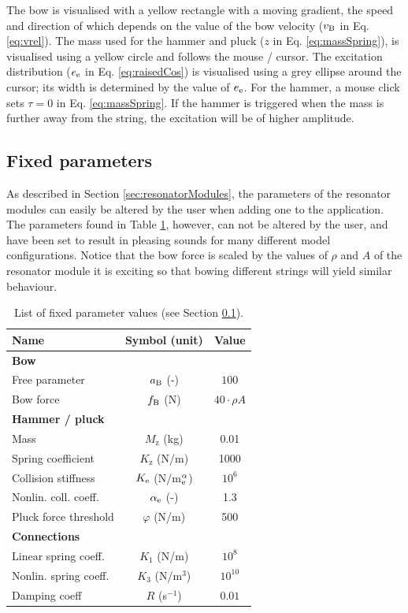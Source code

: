 \documentclass{article}
\begin{document}
The bow is visualised with a yellow rectangle with a moving gradient, the speed and direction of which depends on the value of the bow velocity ($v_{\text{B}}$ in Eq. \eqref{eq:vrel}). The mass used for the hammer and pluck ($z$ in Eq. \eqref{eq:massSpring}), is visualised using a yellow circle and follows the mouse / cursor. The excitation distribution ($e_{\text{e}}$ in Eq. \eqref{eq:raisedCos}) is visualised using a grey ellipse around the cursor; its width is determined by the value of $e_{\text{e}}$. For the hammer, a mouse click sets $\tau=0$ in Eq. \eqref{eq:massSpring}. If the hammer is triggered when the mass is further away from the string, the excitation will be of higher amplitude.

\subsection{Fixed parameters}\label{sec:fixedParams}
As described in Section \ref{sec:resonatorModules}, the parameters of the resonator modules can easily be altered by the user when adding one to the application. The parameters found in Table \ref{tab:parameters}, however, can not be altered by the user, and have been set to result in pleasing sounds for many different model configurations. Notice that the bow force is scaled by the values of $\rho$ and $A$ of the resonator module it is exciting so that bowing different strings will yield similar behaviour.
\begin{table}[t]\label{tab:parameters}
\begin{center}
\begin{tabular}{|l|c|c|}
    \hline
    Name & Symbol (unit) & Value\\ \hline
    \multicolumn{3}{|l|}{\bf Bow}\\ \hline
    Free parameter & $a_{\text{B}}$ (-) & $100$\\
    Bow force & $f_{\text{B}}$ (N) & $40 \cdot \rho A$\\\hline
    \multicolumn{3}{|l|}{\bf Hammer / pluck}\\ \hline
    Mass & $M_\text{z}$ (kg) & 0.01\\
    Spring coefficient & $K_\text{z}$ (N/m) & 1000\\
    Collision stiffness& $K_{\text{e}}$ (N/m$^\alpha_{\text{e}}$) & $10^6$\\
    Nonlin. coll. coeff. & $\alpha_{\text{e}}$ (-) & 1.3\\
    Pluck force threshold & $\varphi$ (N/m) & 500\\\hline
    \multicolumn{3}{|l|}{\bf Connections}\\ \hline
    Linear spring coeff. & $K_1$ (N/m)  & $10^8$ \\
    Nonlin. spring coeff. & $K_3$ (N/m$^3$)  & $10^{10}$\\
    Damping coeff & $R$ (s$^{-1}$) & $0.01$
    \\\hline
\end{tabular}
\caption{List of fixed parameter values (see Section \ref{sec:fixedParams}).}
\end{center}
\end{table}
\end{document}
